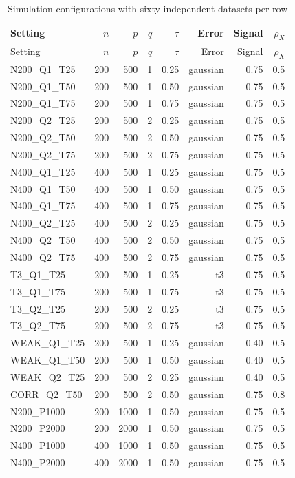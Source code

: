 \begin{longtable}{lrrrrrrr}
\caption{Simulation configurations with sixty independent datasets per row}\label{tab:joint-registry}\\
\toprule
Setting & $n$ & $p$ & $q$ & $\tau$ & Error & Signal & $\rho_X$ \\
\midrule\endfirsthead
\toprule
Setting & $n$ & $p$ & $q$ & $\tau$ & Error & Signal & $\rho_X$ \\
\midrule\endhead
N200\_Q1\_T25 & 200 &  500 & 1 & 0.25 & gaussian & 0.75 & 0.5 \\
N200\_Q1\_T50 & 200 &  500 & 1 & 0.50 & gaussian & 0.75 & 0.5 \\
N200\_Q1\_T75 & 200 &  500 & 1 & 0.75 & gaussian & 0.75 & 0.5 \\
N200\_Q2\_T25 & 200 &  500 & 2 & 0.25 & gaussian & 0.75 & 0.5 \\
N200\_Q2\_T50 & 200 &  500 & 2 & 0.50 & gaussian & 0.75 & 0.5 \\
N200\_Q2\_T75 & 200 &  500 & 2 & 0.75 & gaussian & 0.75 & 0.5 \\
N400\_Q1\_T25 & 400 &  500 & 1 & 0.25 & gaussian & 0.75 & 0.5 \\
N400\_Q1\_T50 & 400 &  500 & 1 & 0.50 & gaussian & 0.75 & 0.5 \\
N400\_Q1\_T75 & 400 &  500 & 1 & 0.75 & gaussian & 0.75 & 0.5 \\
N400\_Q2\_T25 & 400 &  500 & 2 & 0.25 & gaussian & 0.75 & 0.5 \\
N400\_Q2\_T50 & 400 &  500 & 2 & 0.50 & gaussian & 0.75 & 0.5 \\
N400\_Q2\_T75 & 400 &  500 & 2 & 0.75 & gaussian & 0.75 & 0.5 \\
T3\_Q1\_T25 & 200 &  500 & 1 & 0.25 & t3 & 0.75 & 0.5 \\
T3\_Q1\_T75 & 200 &  500 & 1 & 0.75 & t3 & 0.75 & 0.5 \\
T3\_Q2\_T25 & 200 &  500 & 2 & 0.25 & t3 & 0.75 & 0.5 \\
T3\_Q2\_T75 & 200 &  500 & 2 & 0.75 & t3 & 0.75 & 0.5 \\
WEAK\_Q1\_T25 & 200 &  500 & 1 & 0.25 & gaussian & 0.40 & 0.5 \\
WEAK\_Q1\_T50 & 200 &  500 & 1 & 0.50 & gaussian & 0.40 & 0.5 \\
WEAK\_Q2\_T25 & 200 &  500 & 2 & 0.25 & gaussian & 0.40 & 0.5 \\
CORR\_Q2\_T50 & 200 &  500 & 2 & 0.50 & gaussian & 0.75 & 0.8 \\
N200\_P1000 & 200 & 1000 & 1 & 0.50 & gaussian & 0.75 & 0.5 \\
N200\_P2000 & 200 & 2000 & 1 & 0.50 & gaussian & 0.75 & 0.5 \\
N400\_P1000 & 400 & 1000 & 1 & 0.50 & gaussian & 0.75 & 0.5 \\
N400\_P2000 & 400 & 2000 & 1 & 0.50 & gaussian & 0.75 & 0.5 \\
\bottomrule
\end{longtable}

